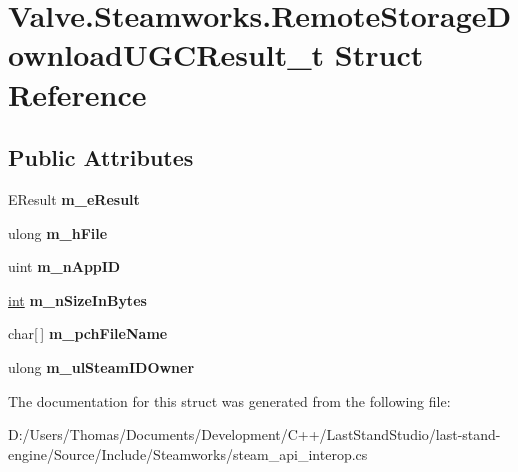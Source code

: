 \hypertarget{structValve_1_1Steamworks_1_1RemoteStorageDownloadUGCResult__t}{}\section{Valve.\+Steamworks.\+Remote\+Storage\+Download\+U\+G\+C\+Result\+\_\+t Struct Reference}
\label{structValve_1_1Steamworks_1_1RemoteStorageDownloadUGCResult__t}
\subsection*{Public Attributes}
\begin{DoxyCompactItemize}
\item 
\hypertarget{structValve_1_1Steamworks_1_1RemoteStorageDownloadUGCResult__t_a38ed605db3a73064dd19ae0dd752faa9}{}E\+Result {\bfseries m\+\_\+e\+Result}\label{structValve_1_1Steamworks_1_1RemoteStorageDownloadUGCResult__t_a38ed605db3a73064dd19ae0dd752faa9}

\item 
\hypertarget{structValve_1_1Steamworks_1_1RemoteStorageDownloadUGCResult__t_ac745cbaa1220db9d001a12c6c633abe6}{}ulong {\bfseries m\+\_\+h\+File}\label{structValve_1_1Steamworks_1_1RemoteStorageDownloadUGCResult__t_ac745cbaa1220db9d001a12c6c633abe6}

\item 
\hypertarget{structValve_1_1Steamworks_1_1RemoteStorageDownloadUGCResult__t_a81951e0e8e809493fc8b6ae5d4d94437}{}uint {\bfseries m\+\_\+n\+App\+I\+D}\label{structValve_1_1Steamworks_1_1RemoteStorageDownloadUGCResult__t_a81951e0e8e809493fc8b6ae5d4d94437}

\item 
\hypertarget{structValve_1_1Steamworks_1_1RemoteStorageDownloadUGCResult__t_acb943bd1884a1917fa01ac21d59038c1}{}\hyperlink{SDL__thread_8h_a6a64f9be4433e4de6e2f2f548cf3c08e}{int} {\bfseries m\+\_\+n\+Size\+In\+Bytes}\label{structValve_1_1Steamworks_1_1RemoteStorageDownloadUGCResult__t_acb943bd1884a1917fa01ac21d59038c1}

\item 
\hypertarget{structValve_1_1Steamworks_1_1RemoteStorageDownloadUGCResult__t_aacb64f47f2f5e0a8c9bb79e984e80ff8}{}char\mbox{[}$\,$\mbox{]} {\bfseries m\+\_\+pch\+File\+Name}\label{structValve_1_1Steamworks_1_1RemoteStorageDownloadUGCResult__t_aacb64f47f2f5e0a8c9bb79e984e80ff8}

\item 
\hypertarget{structValve_1_1Steamworks_1_1RemoteStorageDownloadUGCResult__t_a262615eb832c0ca4738bc6819e139aa7}{}ulong {\bfseries m\+\_\+ul\+Steam\+I\+D\+Owner}\label{structValve_1_1Steamworks_1_1RemoteStorageDownloadUGCResult__t_a262615eb832c0ca4738bc6819e139aa7}

\end{DoxyCompactItemize}


The documentation for this struct was generated from the following file\+:\begin{DoxyCompactItemize}
\item 
D\+:/\+Users/\+Thomas/\+Documents/\+Development/\+C++/\+Last\+Stand\+Studio/last-\/stand-\/engine/\+Source/\+Include/\+Steamworks/steam\+\_\+api\+\_\+interop.\+cs\end{DoxyCompactItemize}

